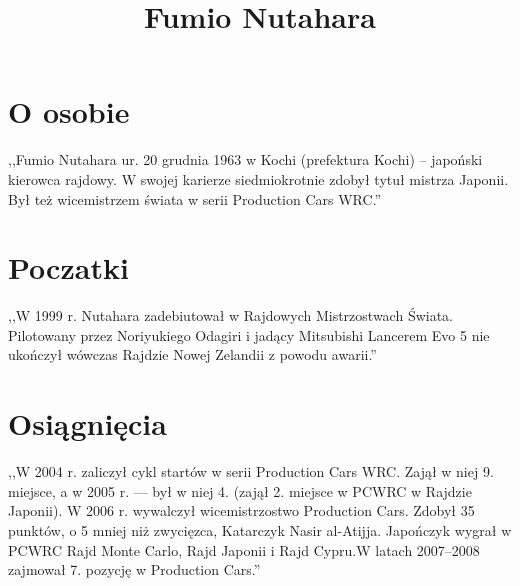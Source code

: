 \documentclass[a4paper,12pt]{article}
\title{Fumio Nutahara}
\author{}
\begin{document}
\maketitle
\section{O osobie}
\label {o_nim}
,,Fumio Nutahara ur. 20 grudnia 1963 w Kochi (prefektura Kochi) – japoński kierowca rajdowy. W swojej karierze siedmiokrotnie zdobył tytuł mistrza Japonii. Był też wicemistrzem świata w serii Production Cars WRC.''
\section{Poczatki}
\label{pocz}
,,W 1999 r. Nutahara zadebiutował w Rajdowych Mistrzostwach Świata. Pilotowany przez Noriyukiego Odagiri i jadący Mitsubishi Lancerem Evo 5 nie ukończył wówczas Rajdzie Nowej Zelandii z powodu awarii.''
\section{Osiągnięcia}
\label{osio}
,,W 2004 r. zaliczył cykl startów w serii Production Cars WRC. Zajął w niej 9. miejsce, a w 2005 r. --- był w niej 4. (zajął 2. miejsce w PCWRC w Rajdzie Japonii). W 2006 r. wywalczył wicemistrzostwo Production Cars. Zdobył 35 punktów, o 5 mniej niż zwycięzca, Katarczyk Nasir al-Atijja. Japończyk wygrał w PCWRC Rajd Monte Carlo, Rajd Japonii i Rajd Cypru.W latach 2007–2008 zajmował 7. pozycję w Production Cars.''
\end{document}
